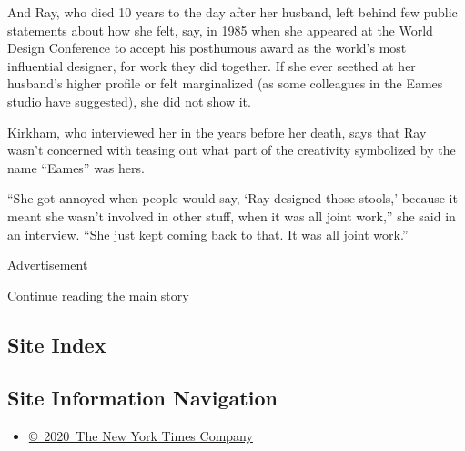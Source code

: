 And Ray, who died 10 years to the day after her husband, left behind few
public statements about how she felt, say, in 1985 when she appeared at
the World Design Conference to accept his posthumous award as the
world's most influential designer, for work they did together. If she
ever seethed at her husband's higher profile or felt marginalized (as
some colleagues in the Eames studio have suggested), she did not show
it.

Kirkham, who interviewed her in the years before her death, says that
Ray wasn't concerned with teasing out what part of the creativity
symbolized by the name ``Eames'' was hers.

``She got annoyed when people would say, `Ray designed those stools,'
because it meant she wasn't involved in other stuff, when it was all
joint work,'' she said in an interview. ``She just kept coming back to
that. It was all joint work.''

Advertisement

\protect\hyperlink{after-bottom}{Continue reading the main story}

\hypertarget{site-index}{%
\subsection{Site Index}\label{site-index}}

\hypertarget{site-information-navigation}{%
\subsection{Site Information
Navigation}\label{site-information-navigation}}

\begin{itemize}
\tightlist
\item
  \href{https://help.nytimes3xbfgragh.onion/hc/en-us/articles/115014792127-Copyright-notice}{©~2020~The
  New York Times Company}
\end{itemize}

